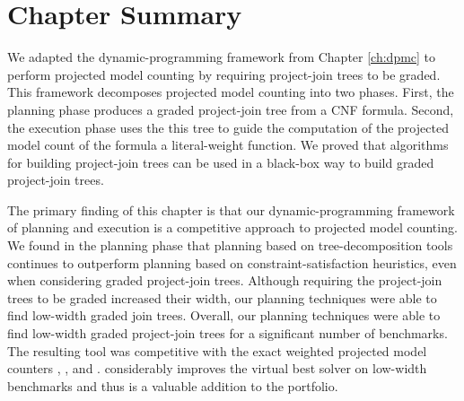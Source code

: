 \section{Chapter Summary}
\label{sec_procount_discussion}

We adapted the dynamic-programming framework from Chapter \ref{ch:dpmc} to perform projected model counting by requiring project-join trees to be graded.
This framework decomposes projected model counting into two phases.
First, the planning phase produces a graded project-join tree from a CNF formula.
Second, the execution phase uses the this tree to guide the computation of the projected model count of the formula \wrt{} a literal-weight function. 
We proved that algorithms for building project-join trees can be used in a black-box way to build graded project-join trees.

{ \color{blue}
The primary finding of this chapter is that our dynamic-programming framework of planning and execution is a competitive approach to projected model counting.
We found in the planning phase that planning based on tree-decomposition tools continues to outperform planning based on constraint-satisfaction heuristics, even when considering graded project-join trees.
Although requiring the project-join trees to be graded increased their width, our planning techniques were able to find low-width graded join trees.
Overall, our planning techniques were able to find low-width graded project-join trees for a significant number of benchmarks.
The resulting tool \procount{} was competitive with the exact weighted projected model counters \dfp{} \cite{lagniez2019recursive}, \projmc{} \cite{lagniez2019recursive}, and \ssat{} \cite{lee2017solving}. 
\procount{} considerably improves the virtual best solver on low-width benchmarks and thus is a valuable addition to the portfolio.
}  %